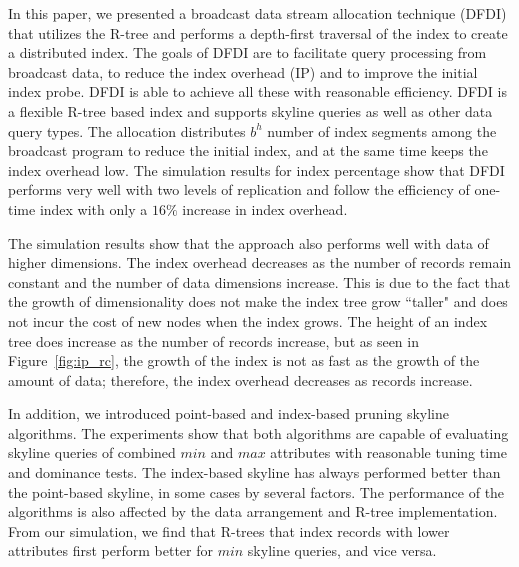 In this paper, we presented a broadcast data stream allocation
technique (DFDI) that utilizes the R-tree and performs a
depth-first traversal of the index to create a distributed index.
The goals of DFDI are to facilitate query processing from
broadcast data, to reduce the index overhead (IP) and to improve
the initial index probe. DFDI is able to achieve all these with
reasonable efficiency. DFDI is a flexible R-tree based index and
supports skyline queries as well as other data query types. The
allocation distributes $b^h$ number of index segments among the
broadcast program to reduce the initial index, and at the same
time keeps the index overhead low. The simulation results for
index percentage show that DFDI performs very well with two levels
of replication and follow the efficiency of one-time index with
only a $16\%$ increase in index overhead.

The simulation results show that the approach also performs well
with data of higher dimensions. The index overhead decreases as
the number of records remain constant and the number of data
dimensions increase. This is due to the fact that the growth of
dimensionality does not make the index tree grow ``taller" and
does not incur the cost of new nodes when the index grows. The
height of an index tree does increase as the number of records
increase, but as seen in Figure~\ref{fig:ip_rc}, the growth of the
index is not as fast as the growth of the amount of data;
therefore, the index overhead decreases as records increase.

In addition, we introduced point-based and index-based pruning
skyline algorithms. The experiments show that both algorithms are
capable of evaluating skyline queries of combined $min$ and $max$
attributes with reasonable tuning time and dominance tests. The
index-based skyline has always performed better than the
point-based skyline, in some cases by several factors. The
performance of the algorithms is also affected by the data
arrangement and R-tree implementation. From our simulation, we
find that R-trees that index records with lower attributes first
perform better for $min$ skyline queries, and vice versa.
